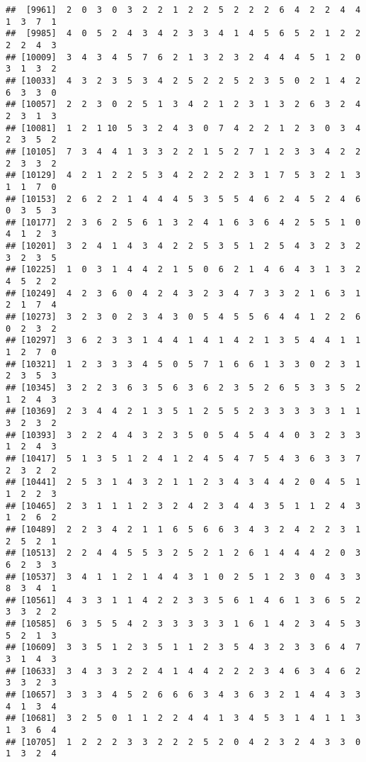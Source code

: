 \documentclass[
]{article}
\begin{document}
\begin{verbatim}
##  [9961]  2  0  3  0  3  2  2  1  2  2  5  2  2  2  6  4  2  2  4  4  1  3  7  1
##  [9985]  4  0  5  2  4  3  4  2  3  3  4  1  4  5  6  5  2  1  2  2  2  2  4  3
## [10009]  3  4  3  4  5  7  6  2  1  3  2  3  2  4  4  4  5  1  2  0  3  1  3  2
## [10033]  4  3  2  3  5  3  4  2  5  2  2  5  2  3  5  0  2  1  4  2  6  3  3  0
## [10057]  2  2  3  0  2  5  1  3  4  2  1  2  3  1  3  2  6  3  2  4  2  3  1  3
## [10081]  1  2  1 10  5  3  2  4  3  0  7  4  2  2  1  2  3  0  3  4  2  3  5  2
## [10105]  7  3  4  4  1  3  3  2  2  1  5  2  7  1  2  3  3  4  2  2  2  3  3  2
## [10129]  4  2  1  2  2  5  3  4  2  2  2  2  3  1  7  5  3  2  1  3  1  1  7  0
## [10153]  2  6  2  2  1  4  4  4  5  3  5  5  4  6  2  4  5  2  4  6  0  3  5  3
## [10177]  2  3  6  2  5  6  1  3  2  4  1  6  3  6  4  2  5  5  1  0  4  1  2  3
## [10201]  3  2  4  1  4  3  4  2  2  5  3  5  1  2  5  4  3  2  3  2  3  2  3  5
## [10225]  1  0  3  1  4  4  2  1  5  0  6  2  1  4  6  4  3  1  3  2  4  5  2  2
## [10249]  4  2  3  6  0  4  2  4  3  2  3  4  7  3  3  2  1  6  3  1  2  1  7  4
## [10273]  3  2  3  0  2  3  4  3  0  5  4  5  5  6  4  4  1  2  2  6  0  2  3  2
## [10297]  3  6  2  3  3  1  4  4  1  4  1  4  2  1  3  5  4  4  1  1  1  2  7  0
## [10321]  1  2  3  3  3  4  5  0  5  7  1  6  6  1  3  3  0  2  3  1  2  3  5  3
## [10345]  3  2  2  3  6  3  5  6  3  6  2  3  5  2  6  5  3  3  5  2  1  2  4  3
## [10369]  2  3  4  4  2  1  3  5  1  2  5  5  2  3  3  3  3  3  1  1  3  2  3  2
## [10393]  3  2  2  4  4  3  2  3  5  0  5  4  5  4  4  0  3  2  3  3  1  2  4  3
## [10417]  5  1  3  5  1  2  4  1  2  4  5  4  7  5  4  3  6  3  3  7  2  3  2  2
## [10441]  2  5  3  1  4  3  2  1  1  2  3  4  3  4  4  2  0  4  5  1  1  2  2  3
## [10465]  2  3  1  1  1  2  3  2  4  2  3  4  4  3  5  1  1  2  4  3  1  2  6  2
## [10489]  2  2  3  4  2  1  1  6  5  6  6  3  4  3  2  4  2  2  3  1  2  5  2  1
## [10513]  2  2  4  4  5  5  3  2  5  2  1  2  6  1  4  4  4  2  0  3  6  2  3  3
## [10537]  3  4  1  1  2  1  4  4  3  1  0  2  5  1  2  3  0  4  3  3  8  3  4  1
## [10561]  4  3  3  1  1  4  2  2  3  3  5  6  1  4  6  1  3  6  5  2  3  3  2  2
## [10585]  6  3  5  5  4  2  3  3  3  3  3  1  6  1  4  2  3  4  5  3  5  2  1  3
## [10609]  3  3  5  1  2  3  5  1  1  2  3  5  4  3  2  3  3  6  4  7  3  1  4  3
## [10633]  3  4  3  3  2  2  4  1  4  4  2  2  2  3  4  6  3  4  6  2  3  3  2  3
## [10657]  3  3  3  4  5  2  6  6  6  3  4  3  6  3  2  1  4  4  3  3  4  1  3  4
## [10681]  3  2  5  0  1  1  2  2  4  4  1  3  4  5  3  1  4  1  1  3  1  3  6  4
## [10705]  1  2  2  2  3  3  2  2  2  5  2  0  4  2  3  2  4  3  3  0  1  3  2  4

\end{verbatim}
\end{document}
